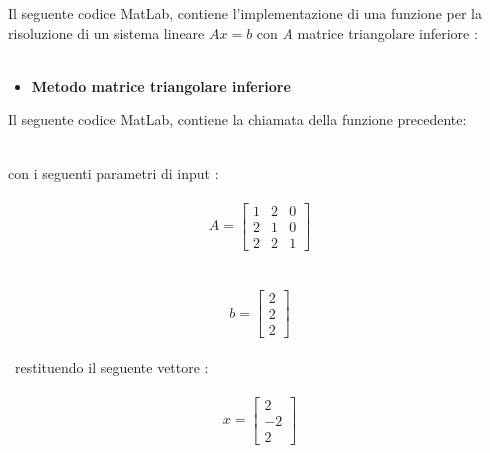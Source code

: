 Il seguente codice MatLab, contiene l'implementazione di una funzione per la risoluzione di un sistema lineare $Ax=b$ con \textit{A} matrice triangolare inferiore :\\\
\begin{itemize}
\item \textbf{Metodo matrice triangolare inferiore}

\end{itemize}
Il seguente codice MatLab, contiene la chiamata della funzione precedente:\\\

con i seguenti parametri di input :\\\
\[
A =\begin{bmatrix}
	1 & 2 & 0 \\ 
	2 & 1 & 0 \\
	2 & 2 & 1 
\end{bmatrix}
\]\\\	
\[
b =\begin{bmatrix}
  2 \\
  2 \\
  2
\end{bmatrix}
\]\\\
restituendo il seguente vettore :\\\
\[
x =\begin{bmatrix}
  2 \\
  -2 \\
  2
\end{bmatrix}
\]